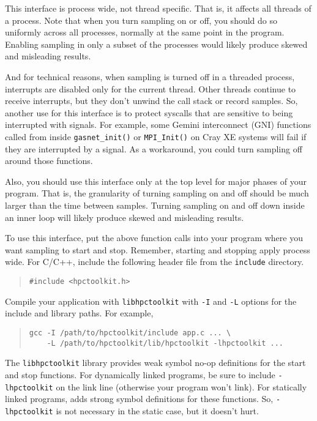 This interface is process wide, not thread specific.  That is, it
affects all threads of a process.  Note that when you turn sampling on
or off, you should do so uniformly across all processes, normally at
the same point in the program.  Enabling sampling in only a subset of
the processes would likely produce skewed and misleading results.

And for technical reasons, when sampling is turned off in a threaded
process, interrupts are disabled only for the current thread.  Other
threads continue to receive interrupts, but they don't unwind the call
stack or record samples.  So, another use for this interface is to
protect syscalls that are sensitive to being interrupted with signals.
For example, some Gemini interconnect (GNI) functions called from
inside \verb|gasnet_init()| or \verb|MPI_Init()| on Cray XE systems
will fail if they are interrupted by a signal.  As a workaround, you
could turn sampling off around those functions.

Also, you should use this interface only at the top level for major
phases of your program.  That is, the granularity of turning sampling
on and off should be much larger than the time between samples.
Turning sampling on and off down inside an inner loop will likely
produce skewed and misleading results.

To use this interface, put the above function calls into your program
where you want sampling to start and stop.  Remember, starting and
stopping apply process wide.  For C/C++, include the following header
file from the \HPCToolkit{} \verb|include| directory.

\begin{quote}
\begin{verbatim}
#include <hpctoolkit.h>
\end{verbatim}
\end{quote}

Compile your application with \verb|libhpctoolkit| with \verb|-I| and
\verb|-L| options for the include and library paths.  For example,

\begin{quote}
\begin{verbatim}
gcc -I /path/to/hpctoolkit/include app.c ... \
    -L /path/to/hpctoolkit/lib/hpctoolkit -lhpctoolkit ...
\end{verbatim}
\end{quote}

The \verb|libhpctoolkit| library provides weak symbol no-op definitions
for the start and stop functions.  For dynamically linked programs, be
sure to include \verb|-lhpctoolkit| on the link line (otherwise your
program won't link).  For statically linked programs, \hpclink{} adds
strong symbol definitions for these functions.  So, \verb|-lhpctoolkit|
is not necessary in the static case, but it doesn't hurt.

